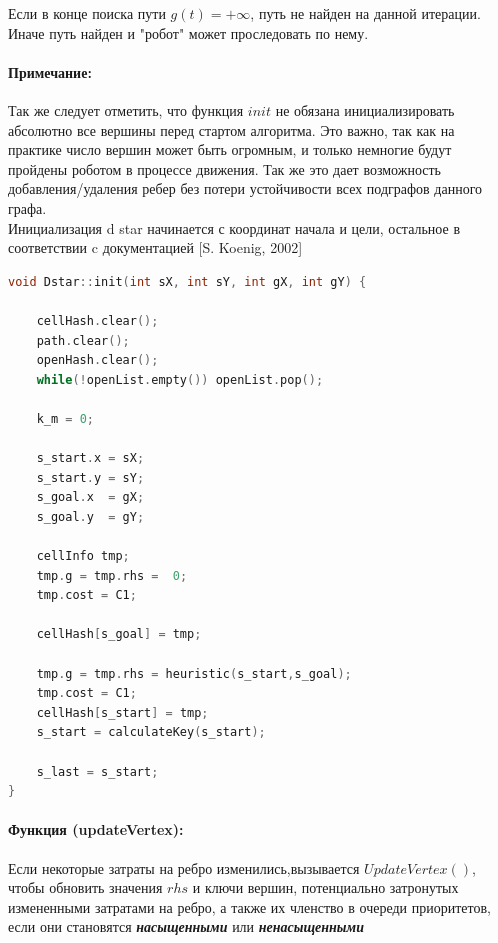 \documentclass[12pt]{article}
\begin{document}
Если в конце поиска пути $g(t) = + \infty$, путь не найден на данной итерации. Иначе путь найден и "робот" может проследовать по нему.
\paragraph{Примечание:} Так же следует отметить, что функция $init$ не обязана инициализировать абсолютно все вершины перед стартом алгоритма. Это важно, так как на практике число вершин может быть огромным, и только немногие будут пройдены роботом в процессе движения. Так же это дает возможность добавления/удаления ребер без потери устойчивости всех подграфов данного графа.\\
Инициализация d star начинается с координат начала и цели, остальное в соответствии c 
документацией [S. Koenig, 2002]
\begin{lstlisting}[language=C,style=C]
void Dstar::init(int sX, int sY, int gX, int gY) {

    cellHash.clear();
    path.clear();
    openHash.clear();
    while(!openList.empty()) openList.pop();

    k_m = 0;

    s_start.x = sX;
    s_start.y = sY;
    s_goal.x  = gX;
    s_goal.y  = gY;

    cellInfo tmp;
    tmp.g = tmp.rhs =  0;
    tmp.cost = C1;

    cellHash[s_goal] = tmp;

    tmp.g = tmp.rhs = heuristic(s_start,s_goal);
    tmp.cost = C1;
    cellHash[s_start] = tmp;
    s_start = calculateKey(s_start);

    s_last = s_start;
}
\end{lstlisting}
\paragraph{Функция (updateVertex):} Если некоторые затраты на ребро изменились,вызывается $UpdateVertex()$, чтобы обновить значения $rhs$ и ключи вершин, потенциально затронутых измененными затратами на ребро, а также их членство в очереди приоритетов, если они становятся \textbf{\emph{насыщенными}} или \textbf{\emph{ненасыщенными}}
\end{document}
